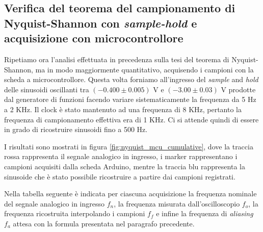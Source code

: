 \documentclass[journal]{IEEEtran}
\begin{document}
\subsection{Verifica del teorema del campionamento di Nyquist-Shannon con \textit{sample-hold} e acquisizione con microcontrollore}

Ripetiamo ora l'analisi effettuata in precedenza sulla tesi del teorema di Nyquist-Shannon, ma in modo maggiormente quantitativo, acquisendo i campioni con la scheda a microcontrollore. Questa volta forniamo all'ingresso del \textit{sample} and \textit{hold} delle sinusoidi oscillanti tra $(-0.400 \pm 0.005)$  V e $(-3.00 \pm 0.03)$ V prodotte dal generatore di funzioni facendo variare sistematicamente la frequenza da 5 Hz a 2 KHz. Il clock è stato mantenuto ad una frequenza di 8 KHz, pertanto la frequenza di campionamento effettiva era di 1 KHz. Ci si attende quindi di essere in grado di ricostruire sinusoidi fino a 500 Hz.

I risultati sono mostrati in figura \ref{fig:nyquist_mcu_cumulative}, dove la traccia rossa rappresenta il segnale analogico in ingresso, i marker rappresentano i campioni acquisiti dalla scheda Arduino, mentre la traccia blu rappresenta la sinusoide che è stato possibile ricostruire a partire dai campioni registrati.

Nella tabella seguente è indicata per ciascuna acquisizione la frequenza nominale del segnale analogico in ingresso $f_n$, la frequenza misurata dall'oscilloscopio $f_o$, la frequenza ricostruita interpolando i campioni $f_f$ e infine la frequenza di \textit{aliasing} $f_a$ attesa con la formula presentata nel paragrafo precedente.

\end{document}
